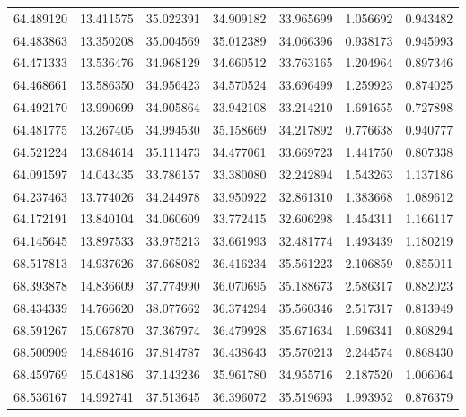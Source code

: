 \begin{tabular}{rrrrrrr}
 64.489120 &  13.411575 &         35.022391 &         34.909182 &         33.965699 &  1.056692 &  0.943482 \\
 64.483863 &  13.350208 &         35.004569 &         35.012389 &         34.066396 &  0.938173 &  0.945993 \\
 64.471333 &  13.536476 &         34.968129 &         34.660512 &         33.763165 &  1.204964 &  0.897346 \\
 64.468661 &  13.586350 &         34.956423 &         34.570524 &         33.696499 &  1.259923 &  0.874025 \\
 64.492170 &  13.990699 &         34.905864 &         33.942108 &         33.214210 &  1.691655 &  0.727898 \\
 64.481775 &  13.267405 &         34.994530 &         35.158669 &         34.217892 &  0.776638 &  0.940777 \\
 64.521224 &  13.684614 &         35.111473 &         34.477061 &         33.669723 &  1.441750 &  0.807338 \\
 64.091597 &  14.043435 &         33.786157 &         33.380080 &         32.242894 &  1.543263 &  1.137186 \\
 64.237463 &  13.774026 &         34.244978 &         33.950922 &         32.861310 &  1.383668 &  1.089612 \\
 64.172191 &  13.840104 &         34.060609 &         33.772415 &         32.606298 &  1.454311 &  1.166117 \\
 64.145645 &  13.897533 &         33.975213 &         33.661993 &         32.481774 &  1.493439 &  1.180219 \\
 68.517813 &  14.937626 &         37.668082 &         36.416234 &         35.561223 &  2.106859 &  0.855011 \\
 68.393878 &  14.836609 &         37.774990 &         36.070695 &         35.188673 &  2.586317 &  0.882023 \\
 68.434339 &  14.766620 &         38.077662 &         36.374294 &         35.560346 &  2.517317 &  0.813949 \\
 68.591267 &  15.067870 &         37.367974 &         36.479928 &         35.671634 &  1.696341 &  0.808294 \\
 68.500909 &  14.884616 &         37.814787 &         36.438643 &         35.570213 &  2.244574 &  0.868430 \\
 68.459769 &  15.048186 &         37.143236 &         35.961780 &         34.955716 &  2.187520 &  1.006064 \\
 68.536167 &  14.992741 &         37.513645 &         36.396072 &         35.519693 &  1.993952 &  0.876379 \\

\end{tabular}
